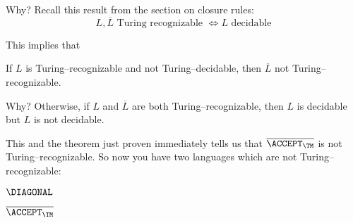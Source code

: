 Why?
Recall this result from the section on closure rules:
\[
L, \overline L \text{ Turing recognizable } \iff L \text{ decidable} 
\]

This implies that

\begin{thm}
If $L$ is Turing--recognizable and not Turing--decidable, then
$\overline L$ not Turing--recognizable.
\end{thm}

Why?
Otherwise, if $L$ and $\overline L$ are both Turing--recognizable,
then $L$ is decidable but $L$ is not decidable.

This and the theorem just proven immediately tells us that
$\overline{\ACCEPT_\TM}$ is not Turing--recognizable.
So now you have two languages which are not Turing--recognizable:
\begin{tightlist}
\item $\DIAGONAL$
\item $\overline{\ACCEPT_\TM}$
\end{tightlist}


